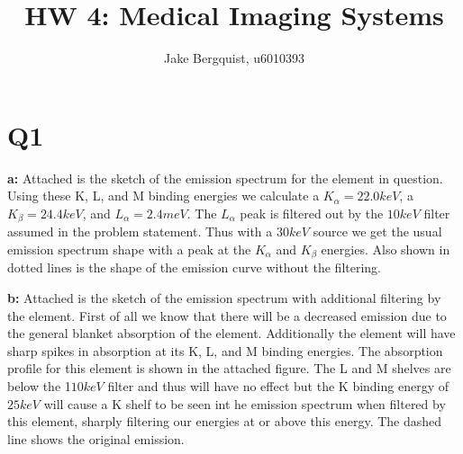 \documentclass[12pt]{article}
\begin{document}
\title{HW 4: Medical Imaging Systems}
\author{Jake Bergquist, u6010393 }
\maketitle

\section{Q1}
\noindent\textbf{a: } Attached is the sketch of the emission spectrum for the element in question. Using these K, L, and M binding energies we calculate a $K_\alpha = 22.0 keV$, a $K_\beta = 24.4 keV$, and $L_\alpha = 2.4 meV$. The $L_\alpha$ peak is filtered out by the $10 keV$ filter assumed in the problem statement. Thus with a $30 keV$ source we get the usual emission spectrum shape with a peak at the $K_\alpha$ and $K_\beta$ energies. Also shown in dotted lines is the shape of the emission curve without the filtering.

\noindent\textbf{b: } Attached is the sketch of the emission spectrum with additional filtering by the element. First of all we know that there will be a decreased emission due to the general blanket absorption of the element. Additionally the element will have sharp spikes in absorption at its K, L, and M binding energies. The absorption profile for this element is shown in the attached figure. The L and M shelves are below the 1$10keV$ filter and thus will have no effect but the K binding energy of $25 keV$ will cause a K shelf to be seen int he emission spectrum when filtered by this element, sharply filtering our energies at or above this energy. The dashed line shows the original emission.
\end{document}
